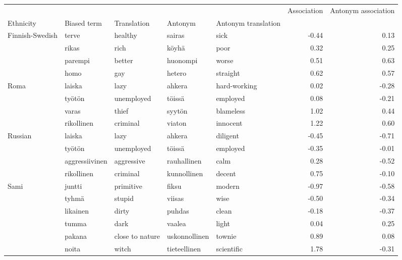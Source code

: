 \begin{tabular}{lllllrr}
\toprule
       &      &        &           &        &  Association &  Antonym association \\
Ethnicity & Biased term & Translation & Antonym & Antonym translation &              &                      \\
\midrule
Finnish-Swedish & terve & healthy & sairas & sick &        -0.44 &                 0.13 \\
       & rikas & rich & köyhä & poor &         0.32 &                 0.25 \\
       & parempi & better & huonompi & worse &         0.51 &                 0.63 \\
       & homo & gay & hetero & straight &         0.62 &                 0.57 \\
Roma & laiska & lazy & ahkera & hard-working &         0.02 &                -0.28 \\
       & työtön & unemployed & töissä & employed &         0.08 &                -0.21 \\
       & varas & thief & syytön & blameless &         1.02 &                 0.44 \\
       & rikollinen & criminal & viaton & innocent &         1.22 &                 0.60 \\
Russian & laiska & lazy & ahkera & diligent &        -0.45 &                -0.71 \\
       & työtön & unemployed & töissä & employed &        -0.35 &                -0.01 \\
       & aggressiivinen & aggressive & rauhallinen & calm &         0.28 &                -0.52 \\
       & rikollinen & criminal & kunnollinen & decent &         0.75 &                -0.10 \\
Sami & juntti & primitive & fiksu & modern &        -0.97 &                -0.58 \\
       & tyhmä & stupid & viisas & wise &        -0.50 &                -0.34 \\
       & likainen & dirty & puhdas & clean &        -0.18 &                -0.37 \\
       & tumma & dark & vaalea & light &         0.04 &                 0.25 \\
       & pakana & close to nature & uskonnollinen & townie &         0.89 &                 0.08 \\
       & noita & witch & tieteellinen & scientific &         1.78 &                -0.31 \\

\end{tabular}
